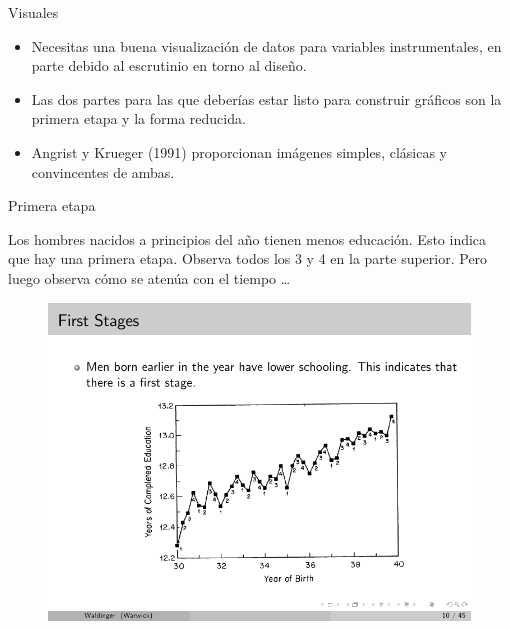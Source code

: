 \documentclass{beamer}
\begin{document}
\begin{frame}{Visuales}

\begin{itemize}
\item Necesitas una buena visualización de datos para variables instrumentales, en parte debido al escrutinio en torno al diseño.
\item Las dos partes para las que deberías estar listo para construir gráficos son la primera etapa y la forma reducida.
\item Angrist y Krueger (1991) proporcionan imágenes simples, clásicas y convincentes de ambas.
\end{itemize}

\end{frame}

\begin{frame}{Primera etapa}
	
	Los hombres nacidos a principios del año tienen menos educación. Esto indica que hay una primera etapa. Observa todos los 3 y 4 en la parte superior. Pero luego observa cómo se atenúa con el tiempo \dots
	
	\begin{figure}
	\includegraphics{./lecture_includes/qob_2.pdf}
	\end{figure}
	
\end{frame}
\end{document}
